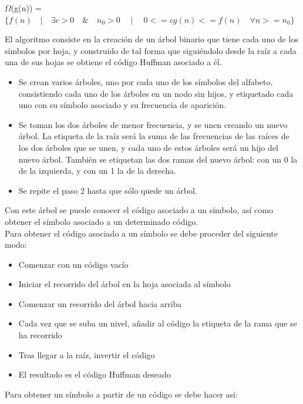 \documentclass[spanish]{article}
\begin{document}
		\hspace{1cm}$\Omega$(g(n)) =$\{f(n) \quad | \quad \exists c >0 \quad \& \quad n_{0}>0 \quad \mid \quad  0<= cg(n)<= f(n) \quad \forall n>= n_{0} \}$
	\bigskip

	El algoritmo consiste en la creación de un árbol binario que tiene cada uno de los símbolos por hoja, y construido de tal forma que siguiéndolo desde la raíz a cada una de sus hojas se obtiene el código Huffman asociado a él.\\

\begin{itemize}
	\item Se crean varios árboles, uno por cada uno de los símbolos del alfabeto, consistiendo cada uno de los árboles en un nodo sin hijos, y etiquetado cada uno con su símbolo asociado y su frecuencia de aparición.
	\item Se toman los dos árboles de menor frecuencia, y se unen creando un nuevo árbol. La etiqueta de la raíz será la suma de las frecuencias de las raíces de los dos árboles que se unen, y cada uno de estos árboles será un hijo del nuevo árbol. También se etiquetan las dos ramas del nuevo árbol: con un 0 la de la izquierda, y con un 1 la de la derecha.
	\item Se repite el paso 2 hasta que sólo quede un árbol.
\end{itemize}

Con este árbol se puede conocer el código asociado a un símbolo, así como obtener el símbolo asociado a un determinado código.\\

Para obtener el código asociado a un símbolo se debe proceder del siguiente modo:\\

\begin{itemize}
	\item Comenzar con un código vacío
	\item Iniciar el recorrido del árbol en la hoja asociada al símbolo
	\item Comenzar un recorrido del árbol hacia arriba
	\item Cada vez que se suba un nivel, añadir al código la etiqueta de la rama que se ha recorrido
	\item Tras llegar a la raíz, invertir el código
	\item El resultado es el código Huffman deseado	
\end{itemize}

\newpage
Para obtener un símbolo a partir de un código se debe hacer así:\\
\end{document}

